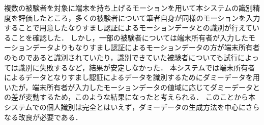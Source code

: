 複数の被験者を対象に端末を持ち上げるモーションを用いて本システムの識別精度を評価したところ，多くの被験者について筆者自身が同様のモーションを入力することで用意したなりすまし認証によるモーションデータとの識別が行えていることを確認した．
しかし，一部の被験者については端末所有者が入力したモーションデータよりもなりすまし認証によるモーションデータの方が端末所有者のものであると識別されていたり，識別できていた被験者についても試行によっては識別に失敗するなど，結果が安定しなかった．
本システムでは端末所有者によるデータとなりすまし認証によるデータを識別するためにダミーデータを用いたが，端末所有者が入力したモーションデータの値域に応じてダミーデータとの差が変動するため，このような結果になったと考えられる．
このことから本システムでの個人識別は完全とはいえず，ダミーデータの生成方法を中心にさらなる改良が必要である．
